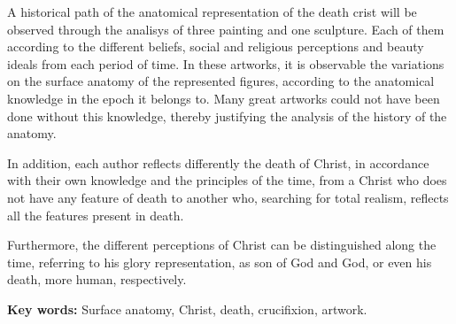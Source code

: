 A historical path of the anatomical representation of the death crist will be observed through the analisys of three painting and one sculpture. Each of them according to the different beliefs, social and religious perceptions and beauty ideals from each period of time.
In these artworks, it is observable the variations on the surface anatomy of the represented figures, according to the anatomical knowledge in the epoch it belongs to. Many great artworks could not have been done without this knowledge, thereby justifying the analysis of the history of the anatomy. 

In addition, each author reflects differently the death of Christ, in accordance with their own knowledge and the principles of the time, from a Christ who does not have any feature of death to another who, searching for total realism, reflects all the features present in death.

Furthermore, the different perceptions of Christ can be distinguished along the time, referring to his glory representation, as son of God and God, or even his death, more human, respectively.


\textbf{Key words:}
Surface anatomy, Christ, death, crucifixion, artwork.